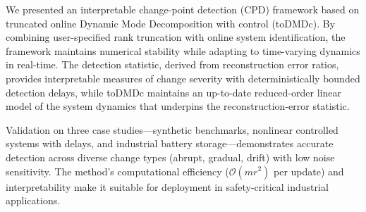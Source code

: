 \documentclass[conference]{IEEEtran}
\begin{document}
We presented an interpretable change-point detection (CPD) framework based on truncated online Dynamic Mode Decomposition with control (toDMDc). By combining user-specified rank truncation with online system identification, the framework maintains numerical stability while adapting to time-varying dynamics in real-time. The detection statistic, derived from reconstruction error ratios, provides interpretable measures of change severity with deterministically bounded detection delays, while toDMDc maintains an up-to-date reduced-order linear model of the system dynamics that underpins the reconstruction-error statistic.

Validation on three case studies—synthetic benchmarks, nonlinear controlled systems with delays, and industrial battery storage—demonstrates accurate detection across diverse change types (abrupt, gradual, drift) with low noise sensitivity. The method's computational efficiency (\(\mathcal{O}(mr^2)\) per update) and interpretability make it suitable for deployment in safety-critical industrial applications.




\end{document}
